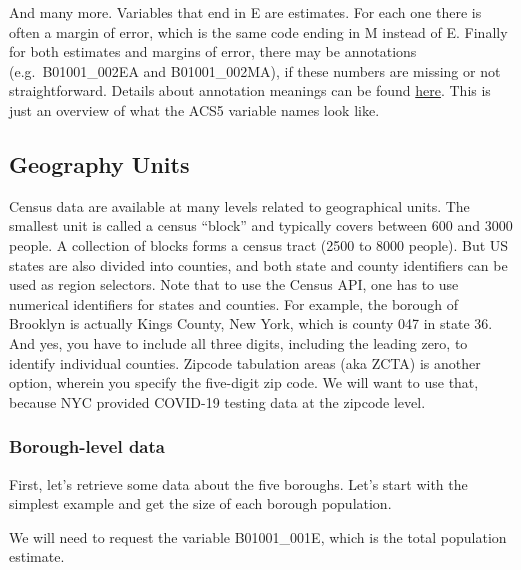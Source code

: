 \documentclass[
  openany]{book}
\begin{document}
And many more. Variables that end in E are estimates. For each one there is often a margin of error, which is the same code ending in M instead of E. Finally for both estimates and margins of error, there may be annotations (e.g.~B01001\_002EA and B01001\_002MA), if these numbers are missing or not straightforward. Details about annotation meanings can be found \href{https://www.census.gov/data/developers/data-sets/acs-1year/notes-on-acs-estimate-and-annotation-values.html}{here}. This is just an overview of what the ACS5 variable names look like.

\hypertarget{geography-units}{%
\subsection*{Geography Units}\label{geography-units}}

Census data are available at many levels related to geographical units. The smallest unit is called a census ``block'' and typically covers between 600 and 3000 people. A collection of blocks forms a census tract (2500 to 8000 people). But US states are also divided into counties, and both state and county identifiers can be used as region selectors. Note that to use the Census API, one has to use numerical identifiers for states and counties. For example, the borough of Brooklyn is actually Kings County, New York, which is county 047 in state 36. And yes, you have to include all three digits, including the leading zero, to identify individual counties. Zipcode tabulation areas (aka ZCTA) is another option, wherein you specify the five-digit zip code. We will want to use that, because NYC provided COVID-19 testing data at the zipcode level.

\hypertarget{borough-level-data}{%
\subsubsection*{Borough-level data}\label{borough-level-data}}

First, let's retrieve some data about the five boroughs. Let's start with the simplest example and get the size of each borough population.

We will need to request the variable B01001\_001E, which is the total population estimate.
\end{document}
